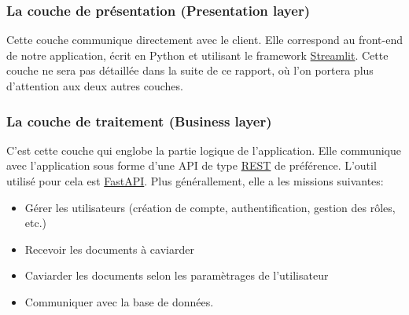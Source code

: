 \documentclass[12pt,a4paper]{article}
\begin{document}
\subsubsection{La couche de présentation (Presentation layer)}
Cette couche communique directement avec le client. Elle correspond au front-end de notre application, écrit en Python et utilisant le framework \href{https://streamlit.io/}{Streamlit}. Cette couche ne sera pas détaillée dans la suite de ce rapport, où l'on portera plus d'attention aux deux autres couches.

\subsubsection{La couche de traitement (Business layer)}
C'est cette couche qui englobe la partie logique de l'application. Elle communique avec l'application sous forme d'une API de type \href{https://fr.wikipedia.org/wiki/Representational_state_transfer}{REST} de préférence. L'outil utilisé pour cela est \href{https://fastapi.tiangolo.com/}{FastAPI}. Plus générallement, elle a les missions suivantes:
\begin{itemize}
\item Gérer les utilisateurs (création de compte, authentification, gestion des rôles, etc.)
\item Recevoir les documents à caviarder
\item Caviarder les documents selon les paramètrages de l'utilisateur
\item Communiquer avec la base de données.
\end{itemize}
\end{document}
